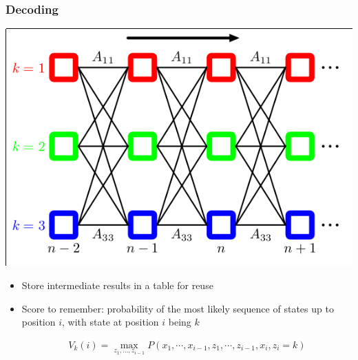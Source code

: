 \documentclass[usenames,dvipsnames]{beamer}
\begin{document}
\begin{frame}
  \frametitle{Decoding}
  \begin{center}
    \includegraphics[scale=0.3]{grid.png}
  \end{center}

  \begin{itemize}
  \item Store intermediate results in a table for reuse
  \item Score to remember: probability of the most likely sequence of
    states up to position $i$, with state at position $i$ being $k$
    \begin{block}{}
      \begin{align*}
        V_k(i) = \max_{z_1,\ldots,z_{i-1}}
        P(x_1,\cdots,x_{i-1},z_1,\cdots,z_{i-1},x_i,z_i=k)
      \end{align*}

    \end{block}
  \end{itemize}
\end{frame}
\end{document}
